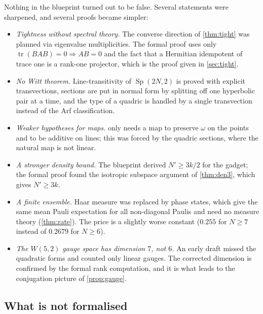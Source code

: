 \documentclass[a4paper,onecolumn,11pt,unpublished,nopdfoutputerror]{quantumarticle}
\theoremstyle{definition}
\newcommand{\tr}{\operatorname{tr}}
\newcommand{\Sp}{\operatorname{Sp}}
\newcommand{\W}[1]{W(#1,2)}
\begin{document}
Nothing in the blueprint turned out to be false. Several statements were sharpened, and several proofs became
simpler:
\begin{itemize}[leftmargin=*]
\item \emph{Tightness without spectral theory.} The converse direction of \cref{thm:tight} was planned via
eigenvalue multiplicities. The formal proof uses only $\tr(BAB)=0\Rightarrow AB=0$ and the fact that a Hermitian
idempotent of trace one is a rank-one projector, which is the proof given in \cref{sec:tight}.
\item \emph{No Witt theorem.} Line-transitivity of $\Sp(2N,2)$ is proved with explicit transvections, sections are
put in normal form by splitting off one hyperbolic pair at a time, and the type of a quadric is handled by a single
transvection instead of the Arf classification.
\item \emph{Weaker hypotheses for maps.}  only needs a map to preserve $\omega$ on the points
and to be additive on lines; this was forced by the quadric sections, where the natural map is not linear.
\item \emph{A stronger density bound.} The blueprint derived $N'\ge3k/2$ for the gadget; the formal proof found the
isotropic subspace argument of \cref{thm:den3}, which gives $N'\ge3k$.
\item \emph{A finite ensemble.} Haar measure was replaced by phase states, which give the same mean Pauli
expectation for all non-diagonal Paulis and need no measure theory (\cref{thm:rate}). The price is a slightly worse
constant ($0.255$ for $N\ge7$ instead of $0.2679$ for $N\ge6$).
\item \emph{The $\W5$ gauge space has dimension $7$, not $6$.} An early draft missed the quadratic forms and counted
only linear gauges. The corrected dimension is confirmed by the formal rank computation, and it is what leads to the
conjugation picture of \cref{prop:gauge}.
\end{itemize}

\subsection{What is not formalised}
\end{document}
